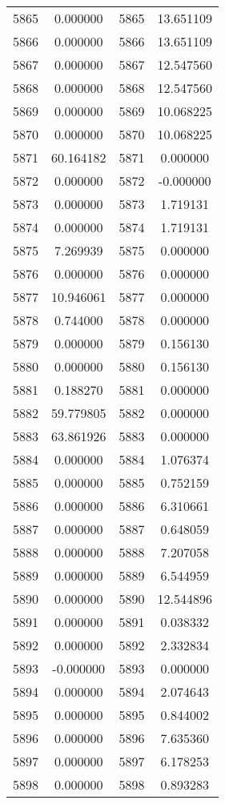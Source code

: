 \documentclass[12pt]{article}
\begin{document}
\begin{longtable}{@{}cccc@{}}
5865 & 0.000000 & 5865 & 13.651109 \\
5866 & 0.000000 & 5866 & 13.651109 \\
5867 & 0.000000 & 5867 & 12.547560 \\
5868 & 0.000000 & 5868 & 12.547560 \\
5869 & 0.000000 & 5869 & 10.068225 \\
5870 & 0.000000 & 5870 & 10.068225 \\
5871 & 60.164182 & 5871 & 0.000000 \\
5872 & 0.000000 & 5872 & -0.000000 \\
5873 & 0.000000 & 5873 & 1.719131 \\
5874 & 0.000000 & 5874 & 1.719131 \\
5875 & 7.269939 & 5875 & 0.000000 \\
5876 & 0.000000 & 5876 & 0.000000 \\
5877 & 10.946061 & 5877 & 0.000000 \\
5878 & 0.744000 & 5878 & 0.000000 \\
5879 & 0.000000 & 5879 & 0.156130 \\
5880 & 0.000000 & 5880 & 0.156130 \\
5881 & 0.188270 & 5881 & 0.000000 \\
5882 & 59.779805 & 5882 & 0.000000 \\
5883 & 63.861926 & 5883 & 0.000000 \\
5884 & 0.000000 & 5884 & 1.076374 \\
5885 & 0.000000 & 5885 & 0.752159 \\
5886 & 0.000000 & 5886 & 6.310661 \\
5887 & 0.000000 & 5887 & 0.648059 \\
5888 & 0.000000 & 5888 & 7.207058 \\
5889 & 0.000000 & 5889 & 6.544959 \\
5890 & 0.000000 & 5890 & 12.544896 \\
5891 & 0.000000 & 5891 & 0.038332 \\
5892 & 0.000000 & 5892 & 2.332834 \\
5893 & -0.000000 & 5893 & 0.000000 \\
5894 & 0.000000 & 5894 & 2.074643 \\
5895 & 0.000000 & 5895 & 0.844002 \\
5896 & 0.000000 & 5896 & 7.635360 \\
5897 & 0.000000 & 5897 & 6.178253 \\
5898 & 0.000000 & 5898 & 0.893283 \\

\end{longtable}
\end{document}
